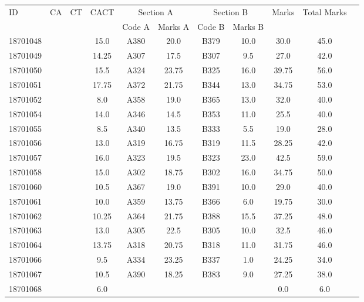 \documentclass[12pt]{article}
\begin{document}
    \begin{center} 
	\renewcommand{\arraystretch}{1.08}
	\begin{small}
    \begin{tabular}{|l|c|c|c|c|c|c|c|c|c|c|} \hline
	\multirow{2}{*}{ID} & 	\multirow{2}{*}{CA}  & 	\multirow{2}{*}{CT}  & 	\multirow{2}{*}{CACT}  & \multicolumn{2 }{c|}{Section A}& \multicolumn{2 }{c|}{Section B} & 	\multirow{2}{*}{Marks}  & 	\multirow{2}{*}{Total Marks}  \\ 
	&  &  &  & Code A & Marks A & Code B & Marks B&  &  \\ \hline
18701048 &  &  & 15.0 & A380 & 20.0 & B379 & 10.0 & 30.0 & 45.0\\ \hline 
18701049 &  &  & 14.25 & A307 & 17.5 & B307 & 9.5 & 27.0 & 42.0\\ \hline 
18701050 &  &  & 15.5 & A324 & 23.75 & B325 & 16.0 & 39.75 & 56.0\\ \hline 
18701051 &  &  & 17.75 & A372 & 21.75 & B344 & 13.0 & 34.75 & 53.0\\ \hline 
18701052 &  &  & 8.0 & A358 & 19.0 & B365 & 13.0 & 32.0 & 40.0\\ \hline 
18701054 &  &  & 14.0 & A346 & 14.5 & B353 & 11.0 & 25.5 & 40.0\\ \hline 
18701055 &  &  & 8.5 & A340 & 13.5 & B333 & 5.5 & 19.0 & 28.0\\ \hline 
18701056 &  &  & 13.0 & A319 & 16.75 & B319 & 11.5 & 28.25 & 42.0\\ \hline 
18701057 &  &  & 16.0 & A323 & 19.5 & B323 & 23.0 & 42.5 & 59.0\\ \hline 
18701058 &  &  & 15.0 & A302 & 18.75 & B302 & 16.0 & 34.75 & 50.0\\ \hline 
18701060 &  &  & 10.5 & A367 & 19.0 & B391 & 10.0 & 29.0 & 40.0\\ \hline 
18701061 &  &  & 10.0 & A359 & 13.75 & B366 & 6.0 & 19.75 & 30.0\\ \hline 
18701062 &  &  & 10.25 & A364 & 21.75 & B388 & 15.5 & 37.25 & 48.0\\ \hline 
18701063 &  &  & 13.0 & A305 & 22.5 & B305 & 10.0 & 32.5 & 46.0\\ \hline 
18701064 &  &  & 13.75 & A318 & 20.75 & B318 & 11.0 & 31.75 & 46.0\\ \hline 
18701066 &  &  & 9.5 & A334 & 23.25 & B337 & 1.0 & 24.25 & 34.0\\ \hline 
18701067 &  &  & 10.5 & A390 & 18.25 & B383 & 9.0 & 27.25 & 38.0\\ \hline 
18701068 &  &  & 6.0 &  &  &  &  & 0.0 & 6.0\\ \hline 

\end{tabular}
\end{small}
\end{center}
\end{document}
